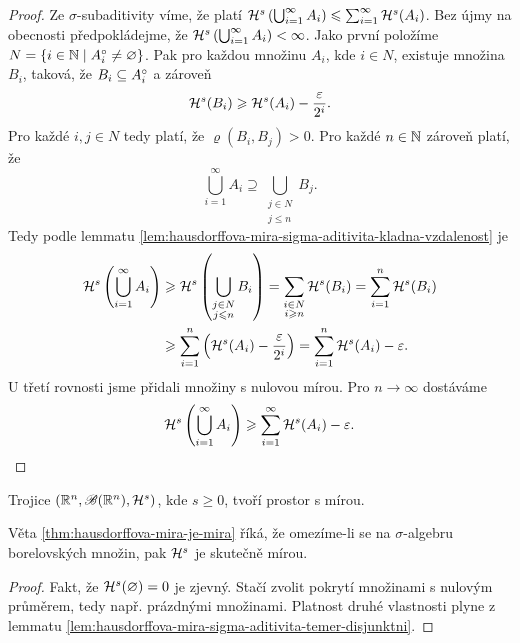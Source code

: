 \begin{proof}
    Ze $\sigma$-subaditivity víme, že platí $\mathcal{H}^s\left(\bigcup_{i=1}^\infty A_i\right)\leqslant\sum_{i=1}^{\infty}\mathcal{H}^s(A_i)$. Bez újmy na obecnosti předpokládejme, že $\mathcal{H}^s\left(\bigcup_{i=1}^\infty A_i\right)<\infty$. Jako první položíme $N=\left\{i\in\mathbb{N}\mid A_i^\circ\neq\varnothing\right\}$. Pak pro každou množinu $A_i$, kde $i\in N$, existuje množina $B_i$, taková, že $B_i\subseteq A_i^\circ$ a zároveň
    \[\mathcal{H}^s(B_i)\geqslant\mathcal{H}^s(A_i)-\dfrac{\varepsilon}{2^i}.\]
    Pro každé $i,j\in N$ tedy platí, že $\varrho(B_i,B_j)>0$. Pro každé $n\in\mathbb{N}$ zároveň platí, že
    \[\bigcup_{i=1}^\infty A_i\supseteq\bigcup_{\substack{j\in N\\j\leqslant n}}B_j.\]
    Tedy podle lemmatu \ref{lem:hausdorffova-mira-sigma-aditivita-kladna-vzdalenost} je
    \begin{align*}
        \mathcal{H}^s\left(\bigcup_{i=1}^\infty A_i\right)&\geqslant\mathcal{H}^s\left(\bigcup_{\substack{j\in N\\j\leqslant n}}B_i\right)=\sum_{\substack{i\in N\\i\geqslant n}}\mathcal{H}^s(B_i)=\sum_{i=1}^{n}\mathcal{H}^s(B_i)\\
        &\geqslant\sum_{i=1}^{n}\left(\mathcal{H}^s(A_i)-\dfrac{\varepsilon}{2^i}\right)=\sum_{i=1}^{n}\mathcal{H}^s(A_i)-\varepsilon.
    \end{align*}
    U třetí rovnosti jsme přidali množiny s nulovou mírou. Pro $n\to\infty$ dostáváme
    \[\mathcal{H}^s\left(\bigcup_{i=1}^\infty A_i\right)\geqslant\sum_{i=1}^{\infty}\mathcal{H}^s(A_i)-\varepsilon.\]
\end{proof}
\begin{theorem}\label{thm:hausdorffova-mira-je-mira}
    Trojice $(\mathbb{R}^n,\mathscr{B}(\mathbb{R}^n),\mathcal{H}^s)$, kde $s\geqslant 0$, tvoří prostor s mírou.
\end{theorem}
Věta \ref{thm:hausdorffova-mira-je-mira} říká, že omezíme-li se na $\sigma$-algebru borelovských množin, pak $\mathcal{H}^s$ je skutečně mírou.
\begin{proof}
    Fakt, že $\mathcal{H}^s(\varnothing)=0$ je zjevný. Stačí zvolit pokrytí množinami s nulovým průměrem, tedy např. prázdnými množinami. Platnost druhé vlastnosti plyne z lemmatu \ref{lem:hausdorffova-mira-sigma-aditivita-temer-disjunktni}.
\end{proof}

